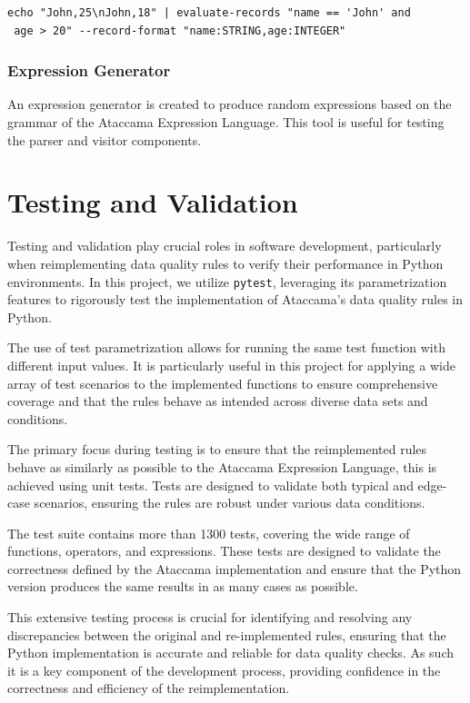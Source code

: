 \begin{verbatim}
echo "John,25\nJohn,18" | evaluate-records "name == 'John' and
 age > 20" --record-format "name:STRING,age:INTEGER"
\end{verbatim}

\subsubsection{Expression Generator}

An expression generator is created to produce random expressions based on the grammar of the Ataccama Expression Language. This tool is useful for testing the parser and visitor components.

\section{Testing and Validation}

Testing and validation play crucial roles in software development, particularly when reimplementing data quality rules to verify their performance in Python environments. In this project, we utilize \texttt{pytest}, leveraging its parametrization features to rigorously test the implementation of Ataccama's data quality rules in Python.

The use of test parametrization allows for running the same test function with different input values. It is particularly useful in this project for applying a wide array of test scenarios to the implemented functions to ensure comprehensive coverage and that the rules behave as intended across diverse data sets and conditions.

The primary focus during testing is to ensure that the reimplemented rules behave as similarly as possible to the Ataccama Expression Language, this is achieved using unit tests. Tests are designed to validate both typical and edge-case scenarios, ensuring the rules are robust under various data conditions.

The test suite contains more than 1300 tests, covering the wide range of functions, operators, and expressions. These tests are designed to validate the correctness defined by the Ataccama implementation and ensure that the Python version produces the same results in as many cases as possible.

This extensive testing process is crucial for identifying and resolving any discrepancies between the original and re-implemented rules, ensuring that the Python implementation is accurate and reliable for data quality checks. As such it is a key component of the development process, providing confidence in the correctness and efficiency of the reimplementation.

